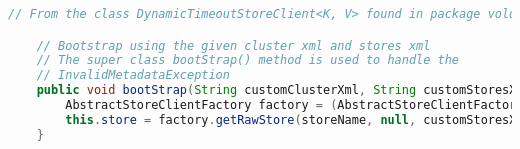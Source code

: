\begin{lstlisting}[language=Java, caption=Demonstrasjon av casting til abstrak klasse.]
    // From the class DynamicTimeoutStoreClient<K, V> found in package voldemort.rest.coordinator;

    // Bootstrap using the given cluster xml and stores xml
    // The super class bootStrap() method is used to handle the
    // InvalidMetadataException
    public void bootStrap(String customClusterXml, String customStoresXml) {
        AbstractStoreClientFactory factory = (AbstractStoreClientFactory) this.storeFactory;
        this.store = factory.getRawStore(storeName, null, customStoresXml, customClusterXml, null);
    } 
\end{lstlisting}
